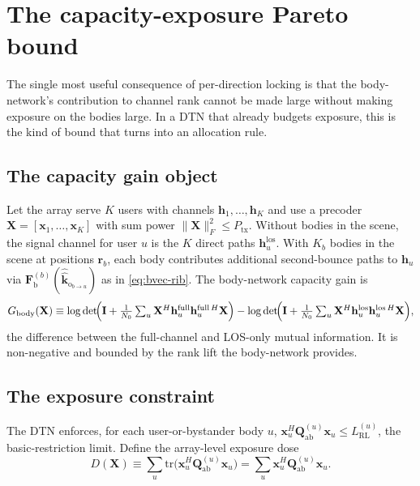 \documentclass[11pt,a4paper]{article}
\theoremstyle{definition}
\newcommand{\rr}{\mathbf{r}}
\newcommand{\Qabs}{\mathbf{Q}_{\mathrm{ab}}}
\newcommand{\kout}{\hat{\bm{k}}_{\mathrm{o}}}
\newcommand{\Frib}{\mathbf{F}_{\mathrm{b}}}
\newcommand{\hh}{\mathbf{h}}
\begin{document}
\section{The capacity-exposure Pareto bound}\label{sec:pareto}

The single most useful consequence of per-direction locking is that
the body-network's contribution to channel rank cannot be made large
without making exposure on the bodies large.  In a DTN that already
budgets exposure, this is the kind of bound that turns into an
allocation rule.

\subsection{The capacity gain object}

Let the array serve $K$ users with channels
$\hh_1,\ldots,\hh_K$ and use a precoder
$\mathbf{X}=[\mathbf{x}_1,\ldots,\mathbf{x}_K]$ with sum power
$\|\mathbf{X}\|_F^2\le P_{\mathrm{tx}}$.  Without bodies in the
scene, the signal channel for user $u$ is the $K$ direct paths
$\hh_u^{\mathrm{los}}$.  With $K_b$ bodies in the scene at positions
$\rr_b$, each body contributes additional second-bounce paths to
$\hh_u$ via $\Frib^{(b)}(\hat\kout_{b\to u})$ as in
\cref{eq:bvec-rib}.  The body-network capacity gain is
\begin{equation}\label{eq:Gbody}
  G_{\mathrm{body}}(\mathbf{X})\equiv
  \log\det\!\Bigl(\mathbf{I}+\textstyle\frac{1}{N_0}\sum_u
            \mathbf{X}^H\hh_u^{\mathrm{full}}\hh_u^{\mathrm{full}\,H}\mathbf{X}\Bigr)
  -\log\det\!\Bigl(\mathbf{I}+\textstyle\frac{1}{N_0}\sum_u
            \mathbf{X}^H\hh_u^{\mathrm{los}}\hh_u^{\mathrm{los}\,H}\mathbf{X}\Bigr),
\end{equation}
the difference between the full-channel and LOS-only mutual
information.  It is non-negative and bounded by the rank lift the
body-network provides.

\subsection{The exposure constraint}

The DTN enforces, for each user-or-bystander body $u$,
$\mathbf{x}_u^H\Qabs^{(u)}\mathbf{x}_u\le L_{\mathrm{RL}}^{(u)}$, the
basic-restriction limit.  Define the array-level exposure dose
\begin{equation}\label{eq:dose}
  D(\mathbf{X})\equiv \sum_u
   \mathrm{tr}\bigl(\mathbf{x}_u^H\Qabs^{(u)}\mathbf{x}_u\bigr)
  =\sum_u\mathbf{x}_u^H\Qabs^{(u)}\mathbf{x}_u.
\end{equation}
\end{document}
